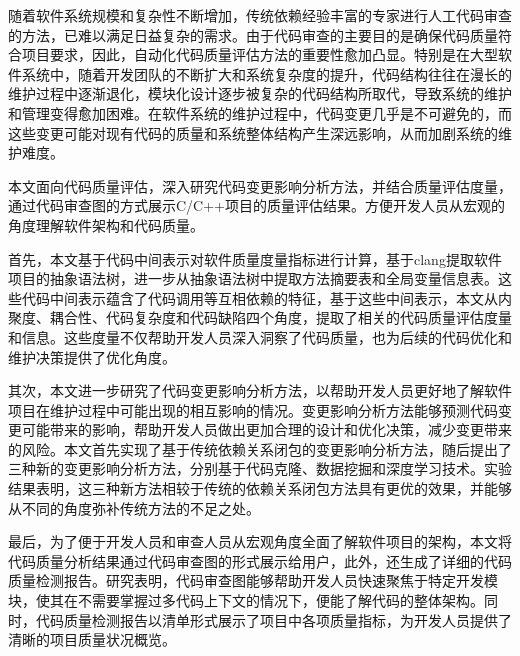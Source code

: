 \begin{cabstract}

  随着软件系统规模和复杂性不断增加，传统依赖经验丰富的专家进行人工代码审查的方法，已难以满足日益复杂的需求。由于代码审查的主要目的是确保代码质量符合项目要求，因此，自动化代码质量评估方法的重要性愈加凸显。特别是在大型软件系统中，随着开发团队的不断扩大和系统复杂度的提升，代码结构往往在漫长的维护过程中逐渐退化，模块化设计逐步被复杂的代码结构所取代，导致系统的维护和管理变得愈加困难。在软件系统的维护过程中，代码变更几乎是不可避免的，而这些变更可能对现有代码的质量和系统整体结构产生深远影响，从而加剧系统的维护难度。

  本文面向代码质量评估，深入研究代码变更影响分析方法，并结合质量评估度量，通过代码审查图的方式展示C/C++项目的质量评估结果。方便开发人员从宏观的角度理解软件架构和代码质量。

  首先，本文基于代码中间表示对软件质量度量指标进行计算，基于clang提取软件项目的抽象语法树，进一步从抽象语法树中提取方法摘要表和全局变量信息表。这些代码中间表示蕴含了代码调用等互相依赖的特征，基于这些中间表示，本文从内聚度、耦合性、代码复杂度和代码缺陷四个角度，提取了相关的代码质量评估度量和信息。这些度量不仅帮助开发人员深入洞察了代码质量，也为后续的代码优化和维护决策提供了优化角度。

  其次，本文进一步研究了代码变更影响分析方法，以帮助开发人员更好地了解软件项目在维护过程中可能出现的相互影响的情况。变更影响分析方法能够预测代码变更可能带来的影响，帮助开发人员做出更加合理的设计和优化决策，减少变更带来的风险。本文首先实现了基于传统依赖关系闭包的变更影响分析方法，随后提出了三种新的变更影响分析方法，分别基于代码克隆、数据挖掘和深度学习技术。实验结果表明，这三种新方法相较于传统的依赖关系闭包方法具有更优的效果，并能够从不同的角度弥补传统方法的不足之处。

  最后，为了便于开发人员和审查人员从宏观角度全面了解软件项目的架构，本文将代码质量分析结果通过代码审查图的形式展示给用户，此外，还生成了详细的代码质量检测报告。研究表明，代码审查图能够帮助开发人员快速聚焦于特定开发模块，使其在不需要掌握过多代码上下文的情况下，便能了解代码的整体架构。同时，代码质量检测报告以清单形式展示了项目中各项质量指标，为开发人员提供了清晰的项目质量状况概览。
\end{cabstract}

